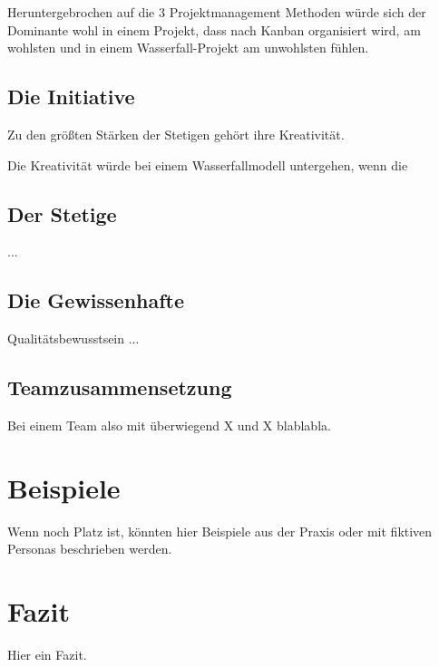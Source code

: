 \documentclass[twocolumn,10pt]{asme2ej}
\begin{document}
Heruntergebrochen auf die 3 Projektmanagement Methoden würde sich der Dominante wohl in einem Projekt, dass nach Kanban organisiert wird, am wohlsten und in einem Wasserfall-Projekt am unwohlsten fühlen.

\subsection{Die Initiative}
Zu den größten Stärken der Stetigen gehört ihre Kreativität.

Die Kreativität würde bei einem Wasserfallmodell untergehen, wenn die 

\subsection{Der Stetige}
...

\subsection{Die Gewissenhafte}
Qualitätsbewusstsein
...


\subsection{Teamzusammensetzung}
Bei einem Team also mit überwiegend X und X blablabla.

\section{Beispiele}
Wenn noch Platz ist, könnten hier Beispiele aus der Praxis oder mit fiktiven Personas beschrieben werden.

\section{Fazit}
Hier ein Fazit.




\end{document}
